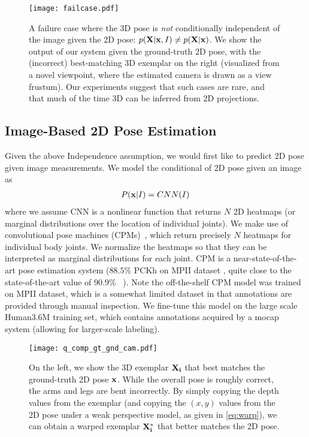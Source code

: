 \documentclass[10pt,twocolumn,letterpaper]{article}
\begin{document}
\begin{figure}[t!]
\centering
\texttt{[image: failcase.pdf]}
\caption{A failure case where the 3D pose is {\em not} conditionally independent of the image given the 2D pose: $p({\bf X}|{\bf x},I) \neq p({\bf X}|{\bf x})$. We show the output of our system given the ground-truth 2D pose,  with the (incorrect) best-matching 3D exemplar on the right (visualized from a novel viewpoint, where the estimated camera is drawn as a view frustum). Our experiments suggest that such cases are rare, and that much of the time 3D can be inferred from 2D projections.}
\label{fig:failcase}
\end{figure}


\subsection{Image-Based 2D Pose Estimation}
Given the above Independence assumption, we would first like to predict 2D pose given image measurements. We model the conditional of 2D pose given an image as
\begin{align}
    P({\bf x}|I) = CNN(I)
\end{align}
\noindent where we assume CNN is a nonlinear function that returns $N$ 2D heatmaps (or marginal distributions over the location of individual joints).
We make use of convolutional pose machines (CPMs)~\cite{Wei_2016_CVPR}, which return precisely $N$ heatmaps for individual body joints. We normalize the heatmaps so that they can be interpreted as marginal distributions for each joint. CPM is a near-state-of-the-art pose estimation system ($88.5\%$ PCKh on MPII dataset \cite{andriluka14cvpr}, quite close to the state-of-the-art value of $90.9\%$ ~\cite{newell2016stacked}). Note the off-the-shelf CPM model was trained on MPII dataset, which is a somewhat limited dataset in that annotations are provided through manual inspection. We fine-tune this model on the large scale Human3.6M \cite{h36m_pami} training set, which contains annotations acquired by a mocap system (allowing for larger-scale labeling).



\begin{figure}
\centering
\texttt{[image: q\_comp\_gt\_gnd\_cam.pdf]}
   \caption{On the left, we show the 3D exemplar ${\bf X_i}$ that best matches the ground-truth 2D pose ${\bf x}$. While the overall pose is roughly correct, the arms and legs are bent incorrectly. By simply copying the depth values from the exemplar (and copying the $(x,y)$ values from the 2D pose under a weak perspective model, as given in \eqref{eq:warp}), we can obtain a warped exemplar ${\bf X_i^*}$ that better matches the 2D pose.}
\label{fig:warp}
\end{figure}
\end{document}
